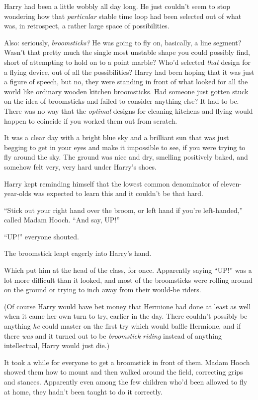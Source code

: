 Harry had been a little wobbly all day long. He just couldn't seem to stop wondering how that \emph{particular} stable time loop had been selected out of what was, in retrospect, a rather large space of possibilities.

Also: seriously, \emph{broomsticks?} He was going to fly on, basically, a line segment? Wasn't that pretty much the single most unstable shape you could possibly find, short of attempting to hold on to a point marble? Who'd selected \emph{that} design for a flying device, out of all the possibilities? Harry had been hoping that it was just a figure of speech, but no, they were standing in front of what looked for all the world like ordinary wooden kitchen broomsticks. Had someone just gotten stuck on the idea of broomsticks and failed to consider anything else? It had to be. There was no way that the \emph{optimal} designs for cleaning kitchens and flying would happen to coincide if you worked them out from scratch.

It was a clear day with a bright blue sky and a brilliant sun that was just begging to get in your eyes and make it impossible to see, if you were trying to fly around the sky. The ground was nice and dry, smelling positively baked, and somehow felt very, very hard under Harry's shoes.

Harry kept reminding himself that the lowest common denominator of eleven-year-olds was expected to learn this and it couldn't be that hard.

``Stick out your right hand over the broom, or left hand if you're left-handed,'' called Madam Hooch. ``And say, UP!''

``UP!'' everyone shouted.

The broomstick leapt eagerly into Harry's hand.

Which put him at the head of the class, for once. Apparently saying ``UP!'' was a lot more difficult than it looked, and most of the broomsticks were rolling around on the ground or trying to inch away from their would-be riders.

(Of course Harry would have bet money that Hermione had done at least as well when it came her own turn to try, earlier in the day. There couldn't possibly be anything \emph{he} could master on the first try which would baffle Hermione, and if there \emph{was} and it turned out to be \emph{broomstick riding} instead of anything intellectual, Harry would just die.)

It took a while for everyone to get a broomstick in front of them. Madam Hooch showed them how to mount and then walked around the field, correcting grips and stances. Apparently even among the few children who'd been allowed to fly at home, they hadn't been taught to do it correctly.

